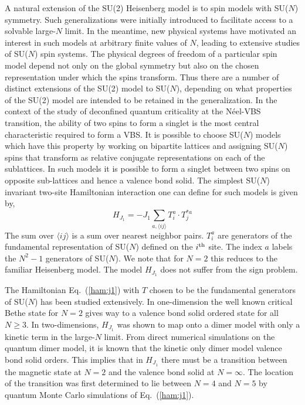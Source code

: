 \documentclass[aps,prb,groupedaddress,twocolumn]{revtex4}
\begin{document}
A natural extension of the SU(2) Heisenberg model is to spin models with
SU($N$) symmetry. Such generalizations were initially introduced to
facilitate access to
a solvable large-$N$ limit. In the meantime, new physical systems have
motivated an interest in such models at arbitrary finite values of
$N$, leading to extensive studies of SU($N$) spin systems. The physical degrees of freedom of a particular
spin model depend not only on the global symmetry but also on the
chosen representation under which the spins transform. Thus there are
a number of distinct extensions of the SU(2) model to SU($N$), depending on
what properties of the SU(2) model are intended to be retained in the
generalization. In the context of the study of deconfined quantum criticality at the
N\'eel-VBS transition, the ability of two spins to form a singlet is the most
central characteristic required to form a VBS. It
is possible to choose SU($N$) models which have this property by
working on bipartite lattices and
assigning SU($N$) spins that transform
as relative conjugate representations
 on each of the sublattices. In such models it is possible to form a singlet
between two spins on opposite sub-lattices and hence a valence bond
solid.  The simplest SU($N$) invariant two-site Hamiltonian interaction one can define for
such models is given by,
\begin{equation}
\label{ham:j1}
H_{J_1} = -J_1 \sum_{a,\langle ij\rangle} T^a_i\cdot T^{*a}_j
\end{equation}
The sum over $\langle ij \rangle$ is a sum over nearest neighbor
pairs. $T^a_i$ are generators of the fundamental representation of SU($N$) defined on the
$i^{\rm th}$ site. The index $a$ labels the $N^2-1$ generators of
SU($N$). We note that for $N=2$ this reduces to the familiar
Heisenberg model. The model $H_{J_1}$ does not suffer from the sign
problem.

The Hamiltonian Eq.~(\ref{ham:j1}) with $T$ chosen to be the
fundamental generators of SU($N$) has been studied extensively. In
one-dimension the well known critical Bethe state for $N=2$ gives way to a valence bond solid
ordered state for all $N\geq 3$.   In two-dimensions, $H_{J_1}$ was shown to map onto a dimer model
with only a kinetic term
in the large-$N$ limit. From direct numerical simulations
on the quantum dimer model, it is known that the kinetic only dimer model
valence bond solid orders.  This implies that in $H_{J_1}$ there must be a transition
between the magnetic state at $N=2$ and the valence bond solid at
$N=\infty$.  The location of the transition was first
determined to lie between $N=4$ and $N=5$ by quantum Monte Carlo
simulations of Eq.~(\ref{ham:j1}).
\end{document}
